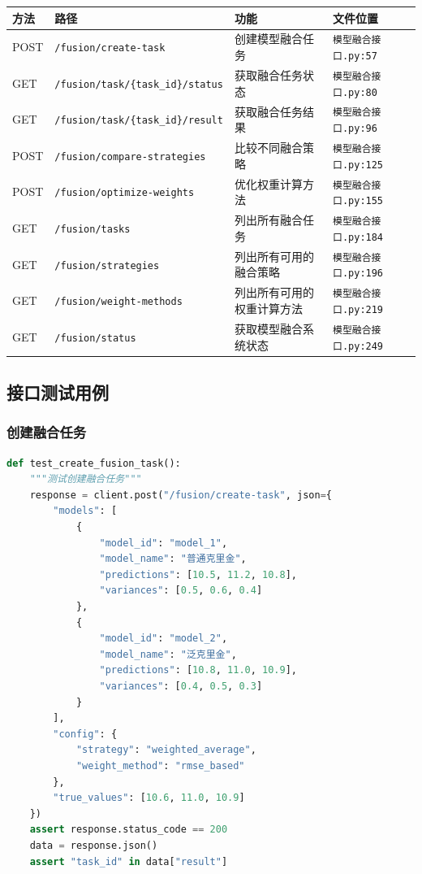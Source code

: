 \documentclass[12pt,a4paper,openany]{report}
\begin{document}
\begin{longtable}{|l|l|l|l|}
\hline
\textbf{方法} & \textbf{路径} & \textbf{功能} & \textbf{文件位置} \\
\hline
\endhead
POST & \texttt{/fusion/create-task} & 创建模型融合任务 & \texttt{模型融合接口.py:57} \\
GET & \texttt{/fusion/task/\{task\_id\}/status} & 获取融合任务状态 & \texttt{模型融合接口.py:80} \\
GET & \texttt{/fusion/task/\{task\_id\}/result} & 获取融合任务结果 & \texttt{模型融合接口.py:96} \\
POST & \texttt{/fusion/compare-strategies} & 比较不同融合策略 & \texttt{模型融合接口.py:125} \\
POST & \texttt{/fusion/optimize-weights} & 优化权重计算方法 & \texttt{模型融合接口.py:155} \\
GET & \texttt{/fusion/tasks} & 列出所有融合任务 & \texttt{模型融合接口.py:184} \\
GET & \texttt{/fusion/strategies} & 列出所有可用的融合策略 & \texttt{模型融合接口.py:196} \\
GET & \texttt{/fusion/weight-methods} & 列出所有可用的权重计算方法 & \texttt{模型融合接口.py:219} \\
GET & \texttt{/fusion/status} & 获取模型融合系统状态 & \texttt{模型融合接口.py:249} \\
\hline
\end{longtable}

\subsection{接口测试用例}

\subsubsection{创建融合任务}

\begin{lstlisting}[language=Python, caption=创建融合任务测试]
def test_create_fusion_task():
    """测试创建融合任务"""
    response = client.post("/fusion/create-task", json={
        "models": [
            {
                "model_id": "model_1",
                "model_name": "普通克里金",
                "predictions": [10.5, 11.2, 10.8],
                "variances": [0.5, 0.6, 0.4]
            },
            {
                "model_id": "model_2",
                "model_name": "泛克里金",
                "predictions": [10.8, 11.0, 10.9],
                "variances": [0.4, 0.5, 0.3]
            }
        ],
        "config": {
            "strategy": "weighted_average",
            "weight_method": "rmse_based"
        },
        "true_values": [10.6, 11.0, 10.9]
    })
    assert response.status_code == 200
    data = response.json()
    assert "task_id" in data["result"]
\end{lstlisting}
\end{document}
